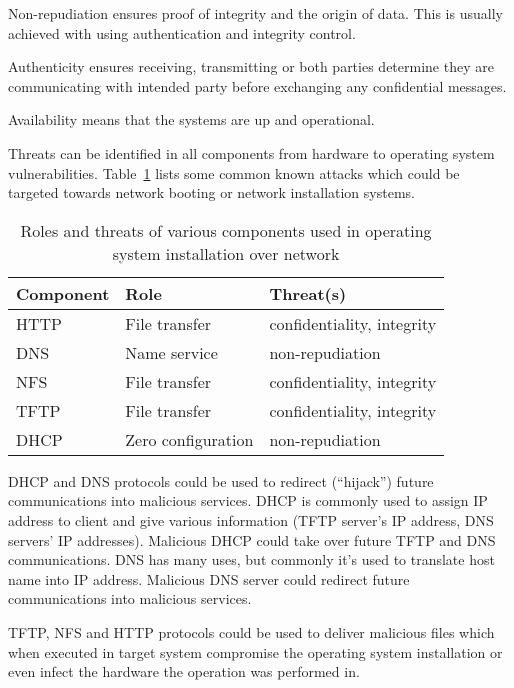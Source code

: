 Non-repudiation ensures proof of integrity and the origin of
data. This is usually achieved with using authentication and integrity
control.

Authenticity ensures receiving, transmitting or both parties determine
they are communicating with intended party before exchanging any
confidential messages.

Availability means that the systems are up and operational.

Threats can be identified in all components from hardware to operating
system vulnerabilities. Table~\ref{tab:threats_table} lists some
common known attacks which could be targeted towards network booting
or network installation systems.

\begin{table}[!ht]
  \def\arraystretch{1.1}%
  \begin{center}
    \label{tab:threats_table}
    \begin{tabular}{| l | l | l |}
      \hline
      Component   & Role               & Threat(s)                  \\
      \hline
      HTTP        & File transfer      & confidentiality, integrity \\
      DNS         & Name service       & non-repudiation            \\
      NFS         & File transfer      & confidentiality, integrity \\
      TFTP        & File transfer      & confidentiality, integrity \\
      DHCP        & Zero configuration & non-repudiation            \\
      \hline
    \end{tabular}
    \caption{Roles and threats of various components used in operating
      system installation over network}
  \end{center}
\end{table}

DHCP and DNS protocols could be used to redirect (``hijack'') future
communications into malicious services. DHCP is commonly used to
assign IP address to client and give various information (TFTP
server's IP address, DNS servers' IP addresses). Malicious DHCP could
take over future TFTP and DNS communications. DNS has many uses, but
commonly it's used to translate host name into IP address. Malicious
DNS server could redirect future communications into malicious
services.

TFTP, NFS and HTTP protocols could be used to deliver malicious files
which when executed in target system compromise the operating system
installation or even infect the hardware the operation was performed
in.

